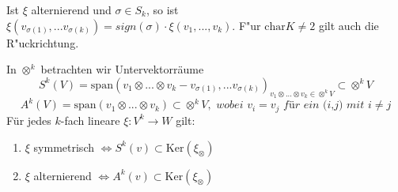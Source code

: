 \documentclass[8pt, a4paper, twocolumn, landscape]{article}
\begin{document}
\begin{remark}
Ist $\xi$ alternierend und $ \sigma  \in S_k$, so ist\\
$
\xi(v_{\sigma(1)},...v_{\sigma(k)}) = \textit{sign}(\sigma) \cdot \xi(v_1,...,v_k).
$
F"ur $\mathrm{char}K \neq 2$ gilt auch die R"uckrichtung.
\end{remark}

\begin{lemma}
In $\otimes^k$ betrachten wir Untervektorräume 
$$ 
S^k(V) = \mathrm{span} (v_1 \otimes... \otimes v_k  - v_{\sigma(1)},...v_{\sigma(k)})_{v_1 \otimes... \otimes v_k \in  \otimes^k V} \subset \otimes^k V
$$
$$ A^k(V) = \mathrm{span} (v_1 \otimes... \otimes v_k) \subset \otimes^k V, \textit{ wobei  } v_i = v_j \textit{ für ein (i,j) mit  } i\neq j 
$$
Für jedes $k$-fach lineare $\xi: V^k \rightarrow W$ gilt:
\vspace{-20pt}
\begin{multicols}{2}
\begin{enumerate}
\item $\xi$ symmetrisch $\Leftrightarrow S^k(v) \subset \mathrm{Ker}(\xi_\otimes)$
\item $\xi$ alternierend $\Leftrightarrow A^k(v) \subset \mathrm{Ker}(\xi_\otimes)$
\end{enumerate}
\end{multicols}
\end{lemma}
\end{document}
